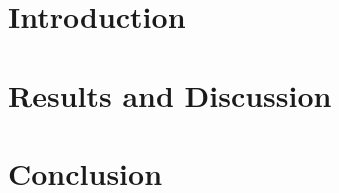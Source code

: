 \documentclass[preprint,12pt,authoryear]{elsarticle}
\begin{document}


\section{Introduction}
\label{sec:into}

\section{Results and Discussion}
\label{sec:result}



\section{Conclusion}
\label{sec:conclusion}
\end{document}
